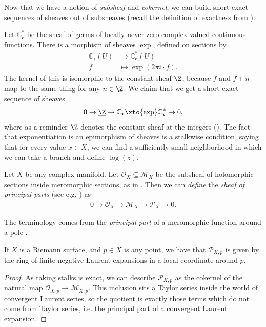 \documentclass[11pt]{book}
\begin{document}
Now that we have a notion of \emph{subsheaf} and \emph{cokernel}, we can build short exact sequences of sheaves out of subsheaves (recall the definition of exactness from ).

\begin{example} Let $\mathbb{C}_{\mathfrak{c}}^\ast$ be the sheaf of germs of locally never zero complex valued continuous functions. There is a morphism of sheaves $\exp$, defined on sections by
\begin{align*}
    \mathbb{C}_{\mathfrak{c}}(U) &\to \mathbb{C}_{\mathfrak{c}}^\ast(U) \\
    f &\mapsto \exp(2\pi i \cdot f).
\end{align*}
The kernel of this is isomorphic to the constant sheaf $\Z$, because $f$ and $f + n$ map to the same thing for any $n \in \Z$. We claim that we get a short exact sequence of sheaves
\begin{align*}
    0 \to \underline{\Z} \to \mathbb{C}_{\mathfrak{c}} \xto{\exp} \mathbb{C}_{\mathfrak{c}}^\ast \to 0,
\end{align*}
where as a reminder $\underline{\Z}$ denotes the constant sheaf at the integers ().
The fact that exponentiation is an epimorphism of sheaves is a stalkwise condition, saying that for every value $x\in X$, we can find a sufficiently small neighborhood in which we can take a branch and define $\log(z)$.
\end{example}

\begin{example} Let $X$ be any complex manifold. Let $\mathcal{O}_X \subseteq \mathcal{M}_X$ be the subsheaf of holomorphic sections inside meromorphic sections, as in . Then we can \emph{define} the \emph{sheaf of principal parts} (see e.g. \cite[(4.2)]{gunningTopicsFunctionTheory2018}) as
\begin{align*}
    0 \to \mathcal{O}_X \to \mathcal{M}_X \to \mathcal{P}_X \to 0.
\end{align*}
\end{example}

The terminology comes from the \emph{principal part} of a meromorphic function around a pole \cite[p.~75]{steinComplexAnalysis2003}.

\begin{proposition} If $X$ is a Riemann surface, and $p\in X$ is any point, we have that $\mathcal{P}_{X,p}$ is given by the ring of finite negative Laurent expansions in a local coordinate around $p$.
\end{proposition}
\begin{proof} As taking stalks is exact, we can describe $\mathcal{P}_{X,p}$ as the cokernel of the natural map $\mathcal{O}_{X,p} \to \mathcal{M}_{X,p}$. This inclusion sits a Taylor series inside the world of convergent Laurent series, so the quotient is exactly those terms which do not come from Taylor series, i.e. the principal part of a convergent Laurent expansion.
\end{proof}
\end{document}
